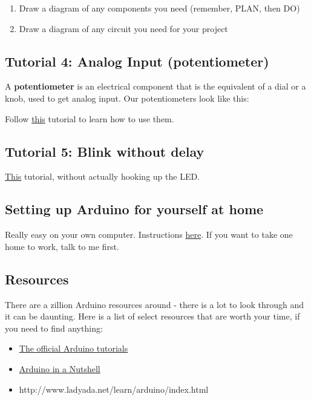 \documentclass[letterpaper,10pt,english]{/usr/local/lib/python2.7/dist-packages/sphinx/texinputs/sphinxhowto}
\begin{document}
\begin{enumerate}[1.]
\item
  Draw a diagram of any components you need (remember, PLAN, then DO)
\item
  Draw a diagram of any circuit you need for your project
\end{enumerate}\subsection{Tutorial 4: Analog Input (potentiometer)}

A \textbf{potentiometer} is an electrical component that is the
equivalent of a dial or a knob, used to get analog input. Our
potentiometers look like this:

Follow \href{http://arduino.cc/en/Tutorial/AnalogReadSerial}{this}
tutorial to learn how to use them.\subsection{Tutorial 5: Blink without delay}

\href{http://arduino.cc/en/Tutorial/BlinkWithoutDelay}{This} tutorial,
without actually hooking up the LED.\subsection{Setting up Arduino for yourself at home}

Really easy on your own computer. Instructions
\href{http://arduino.cc}{here}. If you want to take one home to work,
talk to me first.\subsection{Resources}

There are a zillion Arduino resources around - there is a lot to look
through and it can be daunting. Here is a list of select resources that
are worth your time, if you need to find anything:

\begin{itemize}
\item
  \href{http://arduino.cc/en/Tutorial/HomePage}{The official Arduino
  tutorials}
\item
  \href{http://hci.rwth-aachen.de/arduino}{Arduino in a Nutshell}
\item
  http://www.ladyada.net/learn/arduino/index.html
\end{itemize}
        

        \renewcommand{\indexname}{Index}
        \printindex

    
\end{document}
